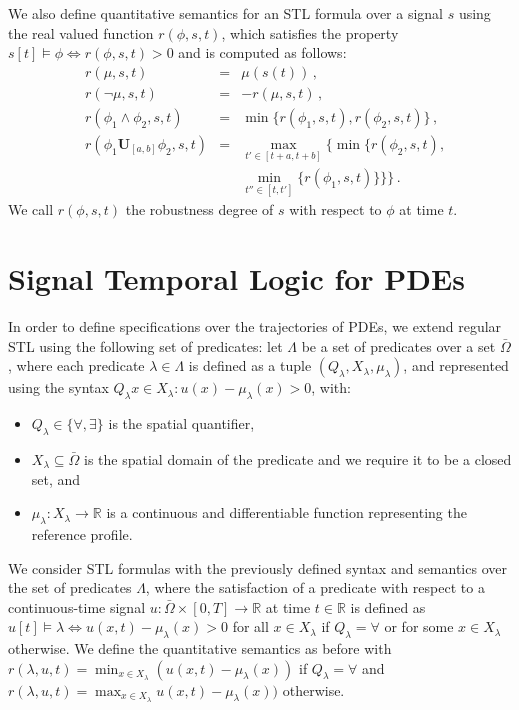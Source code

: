 \documentclass[letterpaper, 10 pt, conference]{ieeeconf/ieeeconf}
\newcommand*{\R}{\mathbb{R}}
\newcommand{\luntil}{\mathbf{U}}
\begin{document}
We also define quantitative semantics for an STL formula over a signal $s$
using the real valued function $r(\phi, s, t)$, which satisfies the property $s[t]
\models \phi \iff r(\phi,s, t) > 0$ and is computed as follows:
%
\begin{equation}
    \begin{aligned}
        &r(\mu, s, t) &= &\mu(s(t)) \,, \\
        &r(\lnot \mu, s, t) &= &-r(\mu, s,t) \,, \\
        &r(\phi_1 \land \phi_2, s, t) &= &\min\{r(\phi_1,s, t),
    r(\phi_2,s, t)\} \,, \\
    &r(\phi_1 \luntil_{[a,b]} \phi_2,s, t) &= 
    &\max_{t' \in [t+a, t+b]} \biggl\{ \min \bigl\{ r(\phi_2,s, t), \\
    & & &\min_{t'' \in [t, t']}\{r(\phi_1,s, t)\} \bigr\} \biggr\} \,.
    \end{aligned}
\end{equation}
%
We call $r(\phi,s, t)$ the robustness degree of $s$ with respect to $\phi$ at
time $t$.

\section{Signal Temporal Logic for PDEs}
\label{sec:signal_temporal_logic_for_pdes}

In order to define specifications over the trajectories of PDEs, we extend
regular STL using the following set of predicates:
let $\Lambda$ be a set of predicates over
a set $\bar\Omega$, where each predicate $\lambda \in \Lambda$ is defined as a
tuple $(Q_\lambda, X_\lambda, \mu_\lambda)$, 
and represented using the syntax $Q_\lambda x \in X_\lambda : u(x) - \mu_\lambda(x) >
0$, with:

\begin{itemize}
    \item $Q_\lambda \in \{\forall, \exists\}$ is the spatial quantifier,
    \item $X_\lambda \subseteq \bar\Omega$ is the spatial domain of the predicate and
        we require it to be a closed set, and 
    \item $\mu_\lambda : X_\lambda \to \R$ is a continuous and differentiable function 
        representing the reference profile.
\end{itemize}

We consider STL formulas 
with the previously defined syntax and semantics 
over the set of predicates $\Lambda$, where the satisfaction of a
predicate with respect to a continuous-time signal $u : \bar\Omega \times [0, T]
\to \R$ at time $t \in \R$ is defined as $u[t] \models \lambda \iff 
u(x, t) - \mu_\lambda(x) > 0$ for all $x \in X_\lambda$ if $Q_\lambda = \forall$ or for some $x \in
X_\lambda$ otherwise. We define the quantitative semantics as before with
$r(\lambda,u, t) = \min_{x \in X_\lambda} (u(x, t) - \mu_\lambda(x))$ if $Q_\lambda = \forall$ and
$r(\lambda,u, t) = \max_{x \in X_\lambda} u(x, t) - \mu_\lambda(x))$ otherwise.
\end{document}
